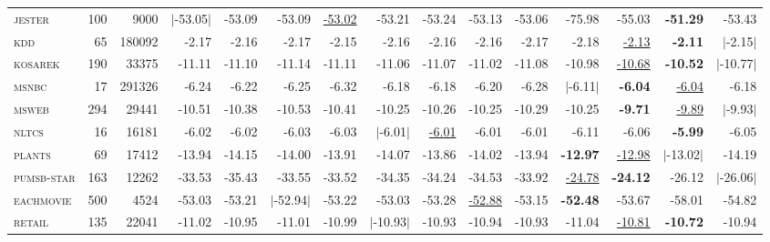 \documentclass[14pt]{ffslides}
\begin{document}
{\begin{tabular}{l|rr|rrrr|rrrr|rrrr}
\textsc{jester    } & 100 & 9000 & $|$-53.05$|$ &  -53.09 &  -53.09 & \underline{-53.02} &  -53.21 &  -53.24 &  -53.13 &  -53.06 &  -75.98 &  -55.03 & \textbf{-51.29} &  -53.43\\
\textsc{kdd       } & 65 & 180092 &   -2.17 &   -2.16 &   -2.17 &   -2.15 &   -2.16 &   -2.16 &   -2.16 &   -2.17 &   -2.18 & \underline{-2.13} & \textbf{-2.11} & $|$-2.15$|$\\
\textsc{kosarek   } & 190 & 33375 &  -11.11 &  -11.10 &  -11.14 &  -11.11 &  -11.06 &  -11.07 &  -11.02 &  -11.08 &  -10.98 & \underline{-10.68} & \textbf{-10.52} & $|$-10.77$|$\\
\textsc{msnbc     } & 17 & 291326 &   -6.24 &   -6.22 &   -6.25 &   -6.32 &   -6.18 &   -6.18 &   -6.20 &   -6.28 & $|$-6.11$|$ & \textbf{-6.04} & \underline{-6.04} &   -6.18\\
\textsc{msweb     } & 294 & 29441 &  -10.51 &  -10.38 &  -10.53 &  -10.41 &  -10.25 &  -10.26 &  -10.25 &  -10.29 &  -10.25 & \textbf{-9.71} & \underline{-9.89} & $|$-9.93$|$\\
\textsc{nltcs     } & 16 & 16181 &   -6.02 &   -6.02 &   -6.03 &   -6.03 & $|$-6.01$|$ & \underline{-6.01} &   -6.01 &   -6.01 &   -6.11 &   -6.06 & \textbf{-5.99} &   -6.05\\
\textsc{plants    } & 69 & 17412 &  -13.94 &  -14.15 &  -14.00 &  -13.91 &  -14.07 &  -13.86 &  -14.02 &  -13.94 & \textbf{-12.97} & \underline{-12.98} & $|$-13.02$|$ &  -14.19\\
\textsc{pumsb-star} & 163 & 12262 &  -33.53 &  -35.43 &  -33.55 &  -33.52 &  -34.35 &  -34.24 &  -34.53 &  -33.92 & \underline{-24.78} & \textbf{-24.12} &  -26.12 & $|$-26.06$|$\\
\textsc{eachmovie } & 500 & 4524 &  -53.03 &  -53.21 & $|$-52.94$|$ &  -53.22 &  -53.03 &  -53.28 & \underline{-52.88} &  -53.15 & \textbf{-52.48} &  -53.67 &  -58.01 &  -54.82\\
\textsc{retail    } & 135 & 22041 &  -11.02 &  -10.95 &  -11.01 &  -10.99 & $|$-10.93$|$ &  -10.93 &  -10.94 &  -10.93 &  -11.04 & \underline{-10.81} & \textbf{-10.72} &  -10.94\\
\hline
\end{tabular}
}

\end{document}
